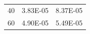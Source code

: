 \documentclass{jreport}		%
\begin{document}
\begin{table}
\begin{center}
\begin{tabular}{c|cc}
40&3.83E-05&8.37E-05 \\
60&4.90E-05&5.49E-05 \\

\end{tabular}
\end{center}
\end{table}
\end{document}
